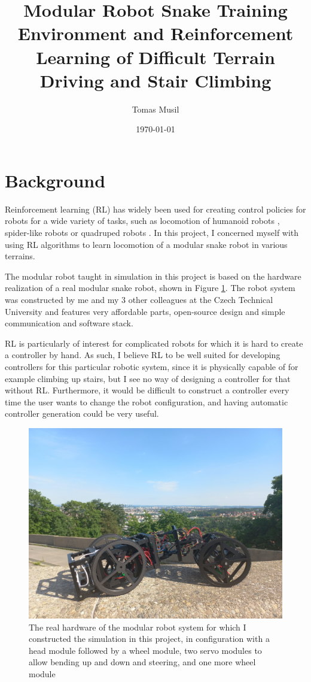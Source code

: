 \documentclass{article}
\author{Tomas Musil}
\date{\today}
\title{Modular Robot Snake Training Environment and Reinforcement Learning of Difficult Terrain Driving and Stair Climbing}
\begin{document}
\maketitle

\section{Background}
Reinforcement learning (RL) has widely been used for creating control policies for robots for a wide variety of tasks, such as locomotion of humanoid robots \cite{ppo}, spider-like robots \cite{emergence} or quadruped robots \cite{massively}.
In this project, I concerned myself with using RL algorithms to learn locomotion of a modular snake robot in various terrains.

The modular robot taught in simulation in this project is based on the hardware realization of a real modular snake robot, shown in Figure \ref{fig:hw}.
The robot system was constructed by me and my 3 other colleagues at the Czech Technical University and features very affordable parts, open-source design and simple communication and software stack.

RL is particularly of interest for complicated robots for which it is hard to create a controller by hand. 
As such, I believe RL to be well suited for developing controllers for this particular robotic system, since it is physically capable of for example climbing up stairs, but I see no way of designing a controller for that without RL.
Furthermore, it would be difficult to construct a controller every time the user wants to change the robot configuration, and having automatic controller generation could be very useful.

\begin{figure}[!h]
 \centering 
  \includegraphics[width=.8\textwidth, trim={15cm 10cm 10cm 45cm}, clip]{fig/snek_real.jpg}
  \caption{The real hardware of the modular robot system for which I constructed the simulation in this project, in configuration with a head module followed by a wheel module, two servo modules to allow bending up and down and steering, and one more wheel module}
\label{fig:hw}
\end{figure}
\end{document}
